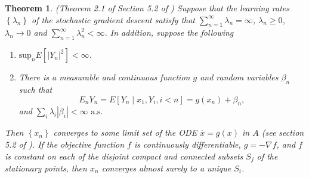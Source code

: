 \documentclass[12pt,english]{article}
\newtheorem{theorem}{Theorem}
\begin{document}
\begin{theorem} 
(Theorem 2.1 of Section 5.2 of \cite{kushner}) 
Suppose that the learning rates $\left\{ \lambda_{n}\right\}$ of the stochastic gradient descent satisfy that $\sum_{n=1}^{\infty}\lambda_{n}=\infty$, $\lambda_{n}\geq0$, $\lambda_{n}\rightarrow0$ and $\sum_{n=1}^{\infty}\lambda_{n}^{2}<\infty$. In addition, suppose the following

\begin{enumerate}
\item $\mbox{sup}_{n}E\left[\left|Y_{n}\right|^{2}\right]<\infty$.
\item There is a measurable and continuous function $g$ and random variables $\beta_{n}$ such that 
\[
E_{n}Y_{n}=E\left[Y_{n}\mid x_{1},Y_{i},i<n\right]=g\left(x_{n}\right)+\beta_{n},
\]
and $\sum_{i}\lambda_{i}\left|\beta_{i}\right|<\infty \mbox{ a.s.}$
\end{enumerate}

Then 
$\left\{ x_{n}\right\} $ converges to some limit set of the ODE $\overset{\cdot}{x}=g\left(x\right)$ in $A$ (see section 5.2 of \cite{kushner}). If the objective function $f$ is continuously differentiable, $g=-\nabla f$, and $f$ is constant on each of the disjoint compact and connected subsets $S_{j}$ of the stationary points, then $x_{n}$ converges almost surely to a unique $S_{i}$.
\end{theorem}
\end{document}
